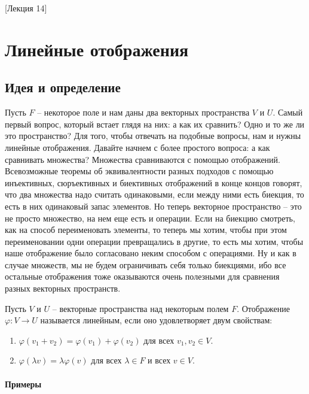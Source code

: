 [Лекция 14]


\newpage
\section{Линейные отображения}

\subsection{Идея и определение}

Пусть $F$ -- некоторое поле и нам даны два векторных пространства $V$ и $U$.
Самый первый вопрос, который встает глядя на них: а как их сравнить?
Одно и то же ли это пространство?
Для того, чтобы отвечать на подобные вопросы, нам и нужны линейные отображения.
Давайте начнем с более простого вопроса: а как сравнивать множества?
Множества сравниваются с помощью отображений.
Всевозможные теоремы об эквивалентности разных подходов с помощью инъективных, сюръективных и биективных отображений в конце концов говорят, что два множества надо считать одинаковыми, если между ними есть биекция, то есть в них одинаковый запас элементов.
Но теперь векторное пространство -- это не просто множество, на нем еще есть и операции.
Если на биекцию смотреть, как на способ переименовать элементы, то теперь мы хотим, чтобы при этом переименовании одни операции превращались в другие, то есть мы хотим, чтобы наше отображение было согласовано неким способом с операциями.
Ну и как в случае множеств, мы не будем ограничивать себя только биекциями, ибо все остальные отображения тоже оказываются очень полезными для сравнения разных векторных пространств.

\begin{definition}
Пусть $V$ и $U$ -- векторные пространства над некоторым полем $F$.
Отображение $\varphi\colon V\to U$ называется линейным, если оно удовлетворяет двум свойствам:
\begin{enumerate}
\item $\varphi(v_1 + v_2) = \varphi(v_1) + \varphi(v_2)$ для всех $v_1,v_2\in V$.

\item $\varphi(\lambda v) = \lambda \varphi(v)$ для всех $\lambda \in F$ и всех $v\in V$.
\end{enumerate}
\end{definition}

\paragraph{Примеры}

